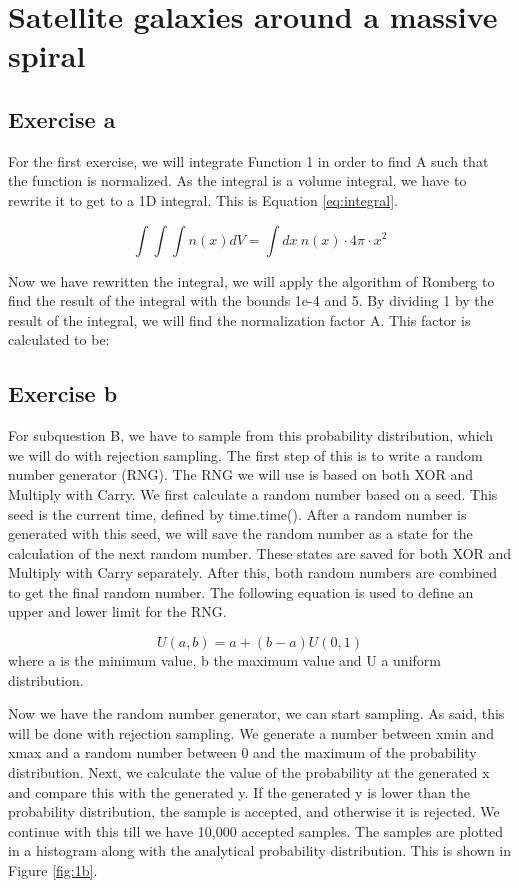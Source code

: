 \section{Satellite galaxies around a massive spiral}

\subsection{Exercise a}



For the first exercise, we will integrate Function 1 in order to find A such that the function is normalized. As the integral is a volume integral, we have to rewrite it to get to a 1D integral. This is Equation \ref{eq:integral}. 

\begin{equation}\label{eq:integral}
    \int\int\int n(x) dV = \int dx\ n(x)\cdot 4\pi \cdot x^2
\end{equation}

Now we have rewritten the integral, we will apply the algorithm of Romberg to find the result of the integral with the bounds 1e-4 and 5. By dividing 1 by the result of the integral, we will find the normalization factor A. This factor is calculated to be: 


\subsection{Exercise b}
For subquestion B, we have to sample from this probability distribution, which we will do with rejection sampling. The first step of this is to write a random number generator (RNG). The RNG we will use is based on both XOR and Multiply with Carry. We first calculate a random number based on a seed. This seed is the current time, defined by time.time(). After a random number is generated with this seed, we will save the random number as a state for the calculation of the next random number. These states are saved for both XOR and Multiply with Carry separately. After this, both random numbers are combined to get the final random number. The following equation is used to define an upper and lower limit for the RNG. 

\begin{equation}
    U(a,b) = a + (b - a) U(0,1)
\end{equation}
where a is the minimum value, b the maximum value and U a uniform distribution.

Now we have the random number generator, we can start sampling. As said, this will be done with rejection sampling. We generate a number between xmin and xmax and a random number between 0 and the maximum of the probability distribution. Next, we calculate the value of the probability at the generated x and compare this with the generated y. If the generated y is lower than the probability distribution, the sample is accepted, and otherwise it is rejected. We continue with this till we have 10,000 accepted samples. The samples are plotted in a histogram along with the analytical probability distribution. This is shown in Figure \ref{fig:1b}.

